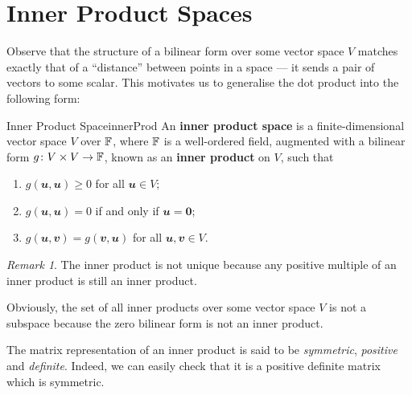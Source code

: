 \documentclass[math]{amznotes}
\theoremstyle{remark}
\newtheorem*{remark}{Remark}
\newcommand{\zero}{\mathbf{0}}
\begin{document}
\section{Inner Product Spaces}
Observe that the structure of a bilinear form over some vector space $V$ matches exactly that of a ``distance'' between points in a space --- it sends a pair of vectors to some scalar. This motivates us to generalise the dot product into the following form:
\begin{dfnbox}{Inner Product Space}{innerProd}
    An {\color{red} \textbf{inner product space}} is a finite-dimensional vector space $V$ over $\mathbb{F}$, where $\mathbb{F}$ is a well-ordered field, augmented with a bilinear form $g \colon V \times V \to \mathbb{F}$, known as an {\color{red} \textbf{inner product}} on $V$, such that
    \begin{enumerate}
        \item $g(\mathbfit{u}, \mathbfit{u}) \geq 0$ for all $\mathbfit{u} \in V$;
        \item $g(\mathbfit{u}, \mathbfit{u}) = 0$ if and only if $\mathbfit{u} = \zero$;
        \item $g(\mathbfit{u}, \mathbfit{v}) = g(\mathbfit{v}, \mathbfit{u})$ for all $\mathbfit{u}, \mathbfit{v} \in V$.
    \end{enumerate}
\end{dfnbox}
\begin{notebox}
    \begin{remark}
        The inner product is not unique because any positive multiple of an inner product is still an inner product.
    \end{remark}
\end{notebox}
Obviously, the set of all inner products over some vector space $V$ is not a subspace because the zero bilinear form is not an inner product.

The matrix representation of an inner product is said to be \textit{symmetric}, \textit{positive} and \textit{definite}. Indeed, we can easily check that it is a positive definite matrix which is symmetric.
\end{document}
